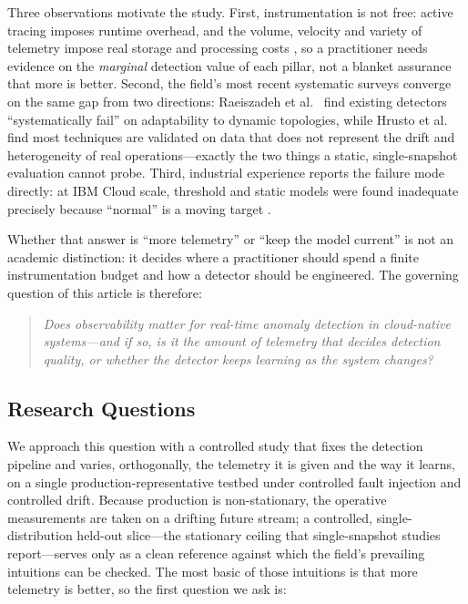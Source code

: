\documentclass[pdflatex,sn-mathphys-num]{sn-jnl}%
\theoremstyle{thmstyleone}%
\theoremstyle{thmstyletwo}%
\theoremstyle{thmstylethree}%
\begin{document}
Three observations motivate the study. First, instrumentation is not free: active tracing imposes runtime overhead, and the volume, velocity and variety of telemetry impose real storage and processing costs \cite{kosinska2023,leadingobs,hausenblas2023roi,huang2025mint}, so a practitioner needs evidence on the \emph{marginal} detection value of each pillar, not a blanket assurance that more is better. Second, the field's most recent systematic surveys converge on the same gap from two directions: Raeiszadeh et al.\ \cite{raeiszadeh2026} find existing detectors ``systematically fail'' on adaptability to dynamic topologies, while Hrusto et al.\ \cite{hrusto2026} find most techniques are validated on data that does not represent the drift and heterogeneity of real operations---exactly the two things a static, single-snapshot evaluation cannot probe. Third, industrial experience reports the failure mode directly: at IBM Cloud scale, threshold and static models were found inadequate precisely because ``normal'' is a moving target \cite{islam2021}.

Whether that answer is ``more telemetry'' or ``keep the model current'' is not an academic distinction: it decides where a practitioner should spend a finite instrumentation budget and how a detector should be engineered. The governing question of this article is therefore:

\begin{quote}\itshape Does observability matter for real-time anomaly detection in cloud-native systems---and if so, is it the \emph{amount} of telemetry that decides detection quality, or \emph{whether the detector keeps learning} as the system changes?\end{quote}

\subsection{Research Questions}\label{sec:rqs}

We approach this question with a controlled study that fixes the detection pipeline and varies, orthogonally, the telemetry it is given and the way it learns, on a single production-representative testbed under controlled fault injection and controlled drift. Because production is non-stationary, the operative measurements are taken on a drifting future stream; a controlled, single-distribution held-out slice---the stationary ceiling that single-snapshot studies report---serves only as a clean reference against which the field's prevailing intuitions can be checked. The most basic of those intuitions is that more telemetry is better, so the first question we ask is:
\end{document}
